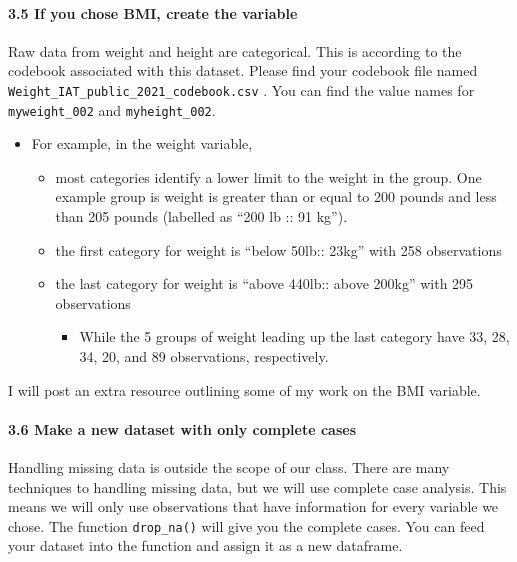 \documentclass[
  letterpaper,
  DIV=11,
  numbers=noendperiod]{scrartcl}
\let\oldparagraph\paragraph
\renewcommand{\paragraph}[1]{\oldparagraph{#1}\mbox{}}
\providecommand{\tightlist}{%
  \setlength{\itemsep}{0pt}\setlength{\parskip}{0pt}}\usepackage{longtable,booktabs,array}
\begin{document}
\hypertarget{if-you-chose-bmi-create-the-variable}{%
\paragraph{3.5 If you chose BMI, create the
variable}\label{if-you-chose-bmi-create-the-variable}}

Raw data from weight and height are categorical. This is according to
the codebook associated with this dataset. Please find your codebook
file named \texttt{Weight\_IAT\_public\_2021\_codebook.csv} . You can
find the value names for \texttt{myweight\_002} and
\texttt{myheight\_002}.

\begin{itemize}
\item
  For example, in the weight variable,

  \begin{itemize}
  \item
    most categories identify a lower limit to the weight in the group.
    One example group is weight is greater than or equal to 200 pounds
    and less than 205 pounds (labelled as ``200 lb :: 91 kg'').
  \item
    the first category for weight is ``below 50lb:: 23kg'' with 258
    observations
  \item
    the last category for weight is ``above 440lb:: above 200kg'' with
    295 observations

    \begin{itemize}
    \tightlist
    \item
      While the 5 groups of weight leading up the last category have 33,
      28, 34, 20, and 89 observations, respectively.
    \end{itemize}
  \end{itemize}
\end{itemize}

I will post an extra resource outlining some of my work on the BMI
variable.

\hypertarget{make-a-new-dataset-with-only-complete-cases}{%
\paragraph{3.6 Make a new dataset with only complete
cases}\label{make-a-new-dataset-with-only-complete-cases}}

Handling missing data is outside the scope of our class. There are many
techniques to handling missing data, but we will use complete case
analysis. This means we will only use observations that have information
for every variable we chose. The function \texttt{drop\_na()} will give
you the complete cases. You can feed your dataset into the function and
assign it as a new dataframe.
\end{document}
